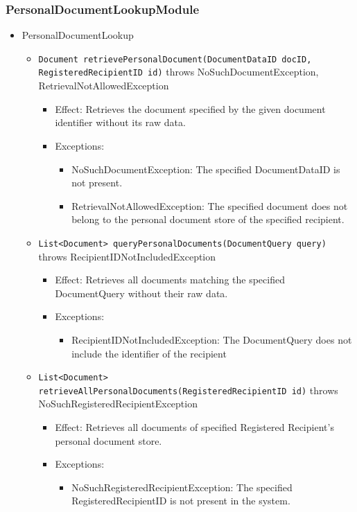 \documentclass[a4paper,10pt]{article}
\begin{document}
\subsubsection*{PersonalDocumentLookupModule}
\begin{itemize}
    \item PersonalDocumentLookup
    \begin{itemize}
        \item \texttt{Document retrievePersonalDocument(DocumentDataID docID, RegisteredRecipientID id)} throws NoSuchDocumentException, RetrievalNotAllowedException
        \begin{itemize}
            \item Effect: Retrieves the document specified by the given document identifier without its raw data.
            \item Exceptions:
            \begin{itemize}
                \item NoSuchDocumentException: The specified DocumentDataID is not present.
                \item RetrievalNotAllowedException: The specified document does not belong to the personal document store of the specified recipient.
            \end{itemize}
        \end{itemize}

        \item \texttt{List<Document> queryPersonalDocuments(DocumentQuery query)} throws RecipientIDNotIncludedException
        \begin{itemize}
            \item Effect: Retrieves all documents matching the specified DocumentQuery without their raw data.
            \item Exceptions:
            \begin{itemize}
                \item RecipientIDNotIncludedException: The DocumentQuery does not include the identifier of the recipient
            \end{itemize}
        \end{itemize}

        \item \texttt{List<Document> retrieveAllPersonalDocuments(RegisteredRecipientID id)} throws NoSuchRegisteredRecipientException
        \begin{itemize}
            \item Effect: Retrieves all documents of specified Registered Recipient's personal document store.
            \item Exceptions:
            \begin{itemize}
                \item NoSuchRegisteredRecipientException: The specified RegisteredRecipientID is not present in the system.
            \end{itemize}
        \end{itemize}
    \end{itemize}
\end{itemize}
\end{document}
